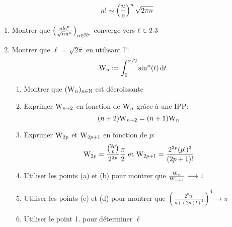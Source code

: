 \begin{theo}
    $$n! \sim \left(\frac{n}{\mathrm{e}}\right)^n \sqrt{2 \pi n}$$
\end{theo}

\begin{preuve}
    \begin{enumerate}
        \item Montrer que $\left( \frac{n!\mathrm{e}^n}{\sqrt{n}n^n} \right)_{n \in \mathbb{N}^\star}$ converge vers $\ell \in 2.3$
        \item Montrer que $\ell = \sqrt{2 \pi}$ en utilisant l':
        $$\Wallis_n \defeq \int_{0}^{\pi/2}\sin^n(t) \d t$$
        \begin{enumerate}
            \item Montrer que $(\mathrm{W}_n)_{n \in \mathbb{N}}$ est décroissante
            \item Exprimer $\mathrm{W}_{n+2}$ en fonction de $\mathrm{W}_n$ grâce à une IPP: $$(n+2)\mathrm{W}_{n+2} = (n+1)\mathrm{W}_n$$
            \item Exprimer $\mathrm{W}_{2p}$ et $\mathrm{W}_{2p+1}$ en fonction de $p$:\\
            $$\mathrm{W}_{2p} = \frac{\binom{2p}{p}}{2^{2p}}\frac{\pi}{2} \text{ et } \mathrm{W}_{2p+1} = \frac{2^{2p} (p!)^2}{(2p+1)!}$$
            \item Utiliser les points (a) et (b) pour montrer que $\frac{\mathrm{W}_n}{\mathrm{W}_{n+1}} \longrightarrow 1$
            \item Utiliser les points (c) et (d) pour montrer que $\left ( \frac{2^n n!}{n ((2n)!)^2} \right)^4 \longrightarrow \pi$
            \item Utiliser le point 1. pour déterminer $\ell$
        \end{enumerate}
    \end{enumerate}
\end{preuve}
